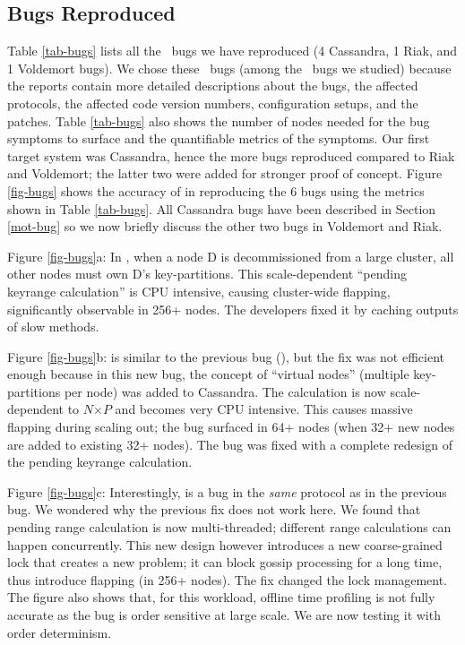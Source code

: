 

\subsection{Bugs Reproduced}
\label{eval-bugs}



Table \ref{tab-bugs} lists all the \numEval\ bugs we have reproduced (4
Cassandra, 1 Riak, and 1 Voldemort bugs).  We chose these \numEval\ bugs (among
the \totAll\ bugs we studied) because the reports contain more detailed
descriptions about the bugs, the affected protocols, the affected code version
numbers, configuration setups, and the patches.  Table \ref{tab-bugs} also
shows the number of nodes needed for the bug symptoms to surface and the
quantifiable metrics of the symptoms.
%
Our first target system was Cassandra, hence the more bugs reproduced compared
to Riak and Voldemort; the latter two were added for  stronger proof of
concept.
%
Figure \ref{fig-bugs} shows the accuracy of \sck in reproducing the 6 bugs
using the metrics shown in Table \ref{tab-bugs}.
%
%
%
All Cassandra bugs have been described in Section \ref{mot-bug} so we now
briefly discuss the other two bugs in Voldemort and Riak.



Figure \ref{fig-bugs}a: In \catwo \cite{CA-Two}, 
when a node D is decommissioned from a
large cluster, all other nodes must own D's key-partitions.
This scale-dependent ``pending keyrange calculation'' is CPU intensive,
causing cluster-wide flapping, significantly observable in 256+ nodes.
The developers fixed it by caching outputs of slow methods.

Figure \ref{fig-bugs}b: \catri \cite{CA-Tri} 
is similar to the previous bug (\catwo),
but the fix was not efficient enough because in this new bug, the concept
of ``virtual nodes'' (multiple key-partitions per node) was added to
Cassandra.  The calculation is now scale-dependent to $N$$\times$$P$ and
becomes very CPU intensive.  This causes massive flapping during scaling out; 
the bug surfaced in 64+ nodes (when 32+ new nodes are added
to existing 32+ nodes). The bug was fixed with a complete 
redesign of the pending keyrange calculation.
%

Figure \ref{fig-bugs}c: Interestingly, \cafour \cite{CA-Four} is 
a bug in the {\em same}
protocol as in the previous bug.  We wondered why the previous fix does
not work here.  We found that pending range calculation is now
multi-threaded; different range calculations can happen concurrently.
This new design however introduces a new coarse-grained lock that creates
a new problem;  it can block gossip processing for a long
time, thus introduce flapping (in 256+ nodes).  The fix changed the
lock management.
%
The figure also shows that, for this workload, offline time profiling
is not fully accurate as the bug is order sensitive at large scale.
We are now testing it with order determinism. 
\fi

